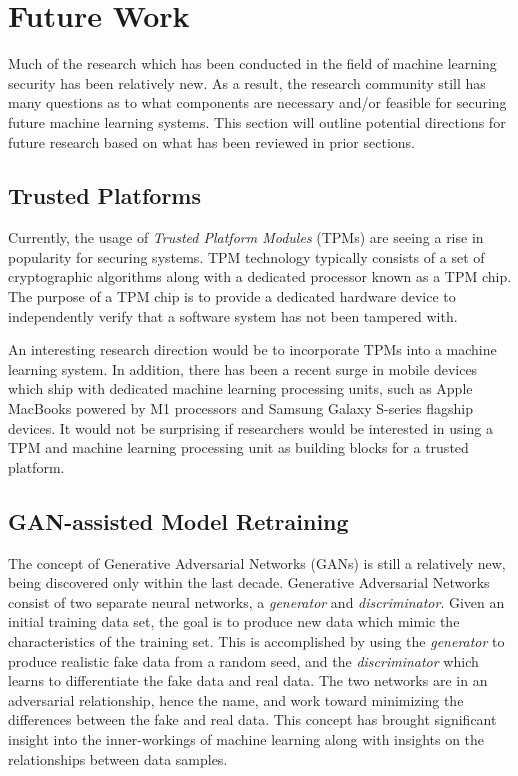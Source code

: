 \documentclass[11pt,conference]{IEEEtran}
\begin{document}
\section{Future Work}
Much of the research which has been conducted in the field of machine learning
security has been relatively new. As a result, the research community still has
many questions as to what components are necessary and/or feasible for securing
future machine learning systems.
This section will outline potential directions for future research based on
what has been reviewed in prior sections.

\subsection{Trusted Platforms}
Currently, the usage of \emph{Trusted Platform Modules} (TPMs) are seeing a
rise in popularity for securing systems. TPM technology typically consists of a
set of cryptographic algorithms along with a dedicated processor known as a TPM
chip. The purpose of a TPM chip is to provide a dedicated hardware device to
independently verify that a software system has not been tampered with. 

An interesting research direction would be to incorporate TPMs into a machine
learning system. In addition, there has been a recent surge in mobile devices
which ship with dedicated machine learning processing units, such as Apple
MacBooks powered by M1 processors and Samsung Galaxy S-series flagship devices.
It would not be surprising if researchers would be interested in using a TPM
and machine learning processing unit as building blocks for a trusted platform.

\subsection{GAN-assisted Model Retraining}
The concept of Generative Adversarial Networks (GANs) is still a relatively
new, being discovered only within the last decade. Generative Adversarial
Networks consist of two separate neural networks, a \emph{generator}
and \emph{discriminator}. Given an initial training data set, the goal is to
produce new data which mimic the characteristics of the training set. This is
accomplished by using the \emph{generator} to produce realistic fake data from
a random seed, and the \emph{discriminator} which learns to differentiate the
fake data and real data. The two networks are in an adversarial relationship,
hence the name, and work toward minimizing the differences between the fake and
real data. This concept has brought significant insight into the inner-workings
of machine learning along with insights on the relationships between data
samples.
\end{document}
